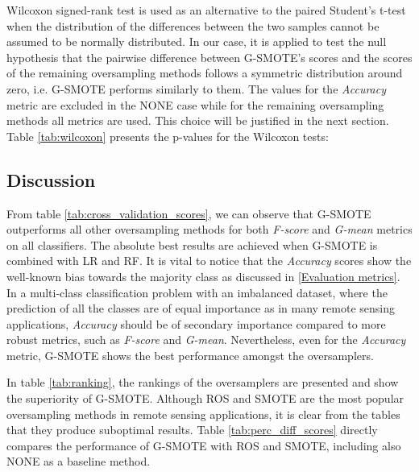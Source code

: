 \documentclass[remotesensing,article,submit,moreauthors,pdftex]{Definitions/mdpi}
\begin{document}
Wilcoxon signed-rank test is used as an alternative to the paired Student's t-test when the distribution of the differences between the two samples cannot be assumed to be normally distributed. In our case, it is applied to test the null hypothesis that the pairwise difference between G-SMOTE's scores and the scores of the remaining oversampling methods follows a symmetric distribution around zero, i.e. G-SMOTE performs similarly to them. The values for the \textit{Accuracy} metric are excluded in the NONE case while for the remaining oversampling methods all metrics are used. This choice will be justified in the next section. Table \ref{tab:wilcoxon} presents the p-values for the Wilcoxon tests:


\subsection{Discussion}

From table \ref{tab:cross_validation_scores}, we can observe that G-SMOTE outperforms all other oversampling methods for both \textit{F-score} and \textit{G-mean} metrics on all classifiers. The absolute best results are achieved when G-SMOTE is combined with LR and RF. It is vital to notice that the \textit{Accuracy} scores show the well-known bias towards the majority class as discussed in \ref{Evaluation metrics}. In a multi-class classification problem with an imbalanced dataset, where the prediction of all the classes are of equal importance as in many remote sensing applications, \textit{Accuracy} should be of secondary importance compared to more robust metrics, such as \textit{F-score} and \textit{G-mean}. Nevertheless, even for the \textit{Accuracy} metric, G-SMOTE shows the best performance amongst the oversamplers.

In table \ref{tab:ranking}, the rankings of the oversamplers are presented
and show the superiority of G-SMOTE. Although ROS and SMOTE are the most popular
oversampling methods in remote sensing applications, it is clear from the tables
that they produce suboptimal results. Table \ref{tab:perc_diff_scores} directly compares the performance of G-SMOTE with ROS and SMOTE, including also NONE as a baseline method.
\end{document}
